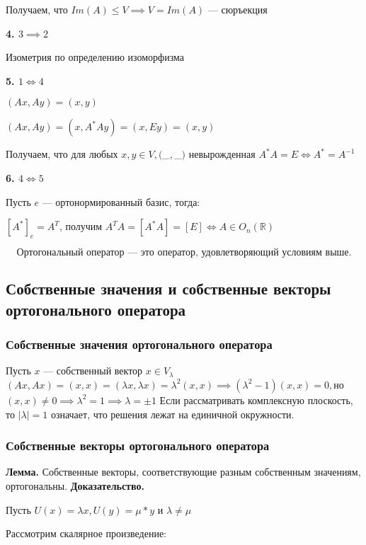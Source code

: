 \documentclass[12pt]{article}
\begin{document}
Получаем, что $Im(A) \leq V \implies V = Im(A)$ — сюръекция

\textbf{4. $ 3 \implies 2 $}

Изометрия по определению изоморфизма

\textbf{5. $ 1 \Longleftrightarrow 4 $}

$(Ax, Ay) = (x,y)$

$(Ax, Ay) = (x,A^*Ay) = (x, Ey) = (x,y)$

Получаем, что для любых $x,y \in V, ($_$,$_$)$ невырожденная \implies$ A^*A = E \Longleftrightarrow A^* = A^{-1}$

\textbf{6. $ 4 \Longleftrightarrow 5 $}

Пусть $e$ — ортонормированный базис, тогда:

$[A^*]_e = A^T$, получим $A^TA = [A^*A] = [E] \Longleftrightarrow A \in O_n(\mathbb{R})$

$$
\boxed{
\text{Ортогональный оператор — это оператор, удовлетворяющий условиям выше.}
}
$$
\subsection{Собственные значения и собственные векторы ортогонального оператора}
\subsubsection{Собственные значения ортогонального оператора}
Пусть $x$ — собственный вектор $x \in V_\lambda$ \newline
$(Ax, Ax) = (x,x) = (\lambda x, \lambda x) = \lambda^2(x,x) \implies (\lambda^2 - 1)(x,x) = 0,$\newline но $(x,x) \ne 0 \implies \lambda^2 = 1 \implies \lambda = \pm 1$\newline
Если рассматривать комплексную плоскость, то $|\lambda| = 1$ означает, что решения лежат на единичной окружности.

\subsubsection{Собственные векторы ортогонального оператора}
\textbf{Лемма.}\newline
Собственные векторы, соответствующие разным собственным значениям, ортогональны.\newline
\textbf{Доказательство.}

Пусть $U(x) = \lambda x, U(y)= \mu *y $ и $\lambda \ne \mu$

Рассмотрим скалярное произведение:
\end{document}
